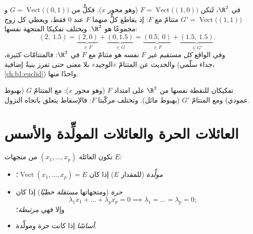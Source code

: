 \begin{example}
\label{ex:b1:vspaces:manysupplements}
في $\R^2$، لتكن $F = \operatorname{Vect}\bigl((1,0)\bigr)$ (وهو
محور $x$). فكلٌّ من $G = \operatorname{Vect}\bigl((0,1)\bigr)$ و
$G' = \operatorname{Vect}\bigl((1,1)\bigr)$ متتامّ مع
$F$: إذ يقاطع كلٌّ منهما $F$ عند $0$ فقط، ويعطي كل زوج مجموعًا هو $\R^2$.
ويختلف تفكيكا المتجهة نفسها:
\[
(2,\ 1.5) = \underbrace{(2, 0)}_{\in F} +
\underbrace{(0, 1.5)}_{\in G}
= \underbrace{(0.5,\ 0)}_{\in F} +
\underbrace{(1.5,\ 1.5)}_{\in G'} .
\]
وفي الواقع \emph{كل} مستقيم غير $F$ نفسه هو
متتامّ مع $F$ في $\R^2$: فالمتتامّات كثيرة،
والحديث عن المتتامّ «الوحيد» بلا معنى حتى تفرز
بنيةٌ إضافية (جداء سلّمي، \cref{ch:b1:euclid})
واحدًا منها.
\end{example}

\begin{omfigure}

{\small تفكيكان للنقطة نفسها من $\R^2$ على امتداد $F$
(وهو محور $x$): مع المتتامّ $G$ (بهبوط عمودي) ومع
المتتامّ $G'$ (بهبوط مائل). وتختلف مركّبتا $F$:
فالإسقاط يتعلق باتجاه النزول.}
\end{omfigure}

\section{العائلات الحرة والعائلات المولِّدة والأسس}

\begin{definition}\label{def:b1:vspaces:free}
تكون العائلة $(x_1, \dots, x_p)$ من متجهات $E$:
\begin{itemize}
  \item \emph{مولِّدة} (للمقدار $E$) إذا كان
        $\operatorname{Vect}(x_1,\dots,x_p) = E$؛
  \item \emph{حرة} (ومتجهاتها \emph{مستقلة
        خطيًا}) إذا كان
        \[
        \lambda_1 x_1 + \dots + \lambda_p x_p = 0
        \implies \lambda_1 = \dots = \lambda_p = 0 ;
        \]
        وإلا فهي \emph{مرتبطة}؛
  \item \emph{أساسًا} إذا كانت حرة ومولِّدة.
\end{itemize}
\end{definition}

